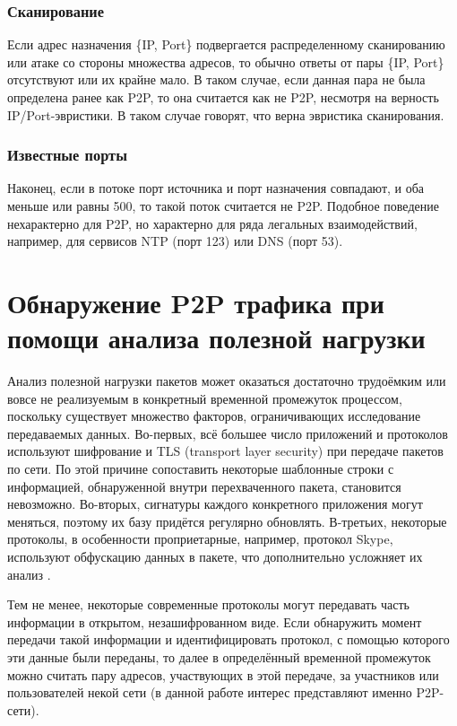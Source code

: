 \documentclass[bachelor, och, coursework]{SCWorks}
\begin{document}
\subsubsection{Сканирование}
Если адрес назначения \{IP, Port\} подвергается распределенному сканированию или атаке со
стороны множества адресов, то обычно ответы от пары \{IP, Port\} отсутствуют или их крайне мало. В таком случае, если данная пара не была определена ранее как P2P, то она считается как не P2P, несмотря на верность IP/Port-эвристики. В таком случае говорят, что верна эвристика сканирования.

\subsubsection{Известные порты}
Наконец, если в потоке порт источника и порт назначения совпадают, и оба меньше или равны 500, то такой поток считается не P2P. Подобное поведение нехарактерно для P2P, но характерно для ряда легальных взаимодействий, например, для сервисов NTP (порт 123) или DNS (порт 53). 

\section{Обнаружение P2P трафика при помощи анализа полезной нагрузки}
Анализ полезной нагрузки пакетов может оказаться достаточно трудоёмким или вовсе не реализуемым в конкретный временной промежуток процессом, поскольку существует множество факторов, ограничивающих исследование передаваемых данных. Во-первых, всё большее число приложений и протоколов используют шифрование и TLS (transport layer security) при передаче пакетов по сети. По этой причине сопоставить некоторые шаблонные строки с информацией, обнаруженной внутри перехваченного пакета, становится невозможно. Во-вторых, сигнатуры каждого конкретного приложения могут меняться, поэтому их базу придётся регулярно обновлять. В-третьих, некоторые протоколы, в особенности проприетарные, например, протокол Skype, используют обфускацию данных в пакете, что дополнительно усложняет их анализ \cite{skype_obf}. 

Тем не менее, некоторые современные протоколы могут передавать часть информации в открытом, незашифрованном виде. Если обнаружить момент передачи такой информации и идентифицировать протокол, с помощью которого эти данные были переданы, то далее в определённый временной промежуток можно считать пару адресов, участвующих в этой передаче, за участников или пользователей некой сети (в данной работе интерес представляют именно P2P-сети).
\end{document}
